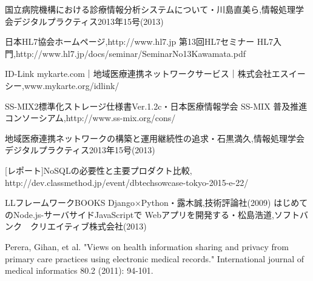 \documentclass[12pt]{sotsuron}
\begin{document}
\begin{thebibliography}{12}
	 国立病院機構における診療情報分析システムについて・川島直美ら,情報処理学会デジタルプラクティス2013年15号(2013)


	 日本HL7協会ホームページ,http://www.hl7.jp
   第13回HL7セミナー HL7入門,http://www.hl7.jp/docs/seminar/SeminarNo13Kawamata.pdf

   ID-Link mykarte.com｜地域医療連携ネットワークサービス｜株式会社エスイーシー,www.mykarte.org/idlink/


	 SS-MIX2標準化ストレージ仕様書Ver.1.2c・日本医療情報学会
	 SS-MIX 普及推進コンソーシアム,http://www.ss-mix.org/cons/



	 地域医療連携ネットワークの構築と運用継続性の追求・石黒満久,情報処理学会デジタルプラクティス2013年15号(2013)

	 [レポート]NoSQLの必要性と主要プロダクト比較, http://dev.classmethod.jp/event/dbtechsowcase-tokyo-2015-e-22/

   LLフレームワークBOOKS Django×Python・露木誠,技術評論社(2009)
   はじめてのNode.js-サーバサイドJavaScriptで Webアプリを開発する・松島浩道,ソフトバンク　クリエイティブ株式会社(2013)

   Perera, Gihan, et al. "Views on health information sharing and privacy from primary care practices using electronic medical records." International journal of medical informatics 80.2 (2011): 94-101.


\end{thebibliography}


\clearpage

\listoffigures
\clearpage

\listoftables
\clearpage
\end{document}
